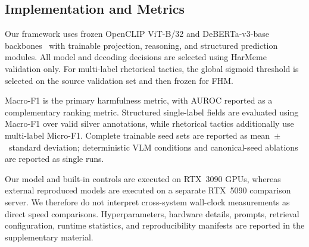 \subsection{Implementation and Metrics}
\label{sec:setup:metrics}

Our framework uses frozen OpenCLIP ViT-B/32 and DeBERTa-v3-base
backbones~\cite{radford2021clip,cherti2023openclip,he2023debertav3}
with trainable projection, reasoning, and structured
prediction modules.
All model and decoding decisions are selected using HarMeme
validation only.
For multi-label rhetorical tactics, the global sigmoid threshold is
selected on the source validation set and then frozen for FHM.

Macro-F1 is the primary harmfulness metric, with AUROC reported as a
complementary ranking metric.
Structured single-label fields are evaluated using Macro-F1 over valid
silver annotations, while rhetorical tactics additionally use
multi-label Micro-F1.
Complete trainable seed sets are reported as mean~$\pm$~standard
deviation; deterministic VLM conditions and canonical-seed ablations
are reported as single runs.

Our model and built-in controls are executed on RTX~3090 GPUs, whereas
external reproduced models are executed on a separate RTX~5090
comparison server.
We therefore do not interpret cross-system wall-clock measurements as
direct speed comparisons.
Hyperparameters, hardware details, prompts, retrieval configuration,
runtime statistics, and reproducibility manifests are reported in the
supplementary material.
